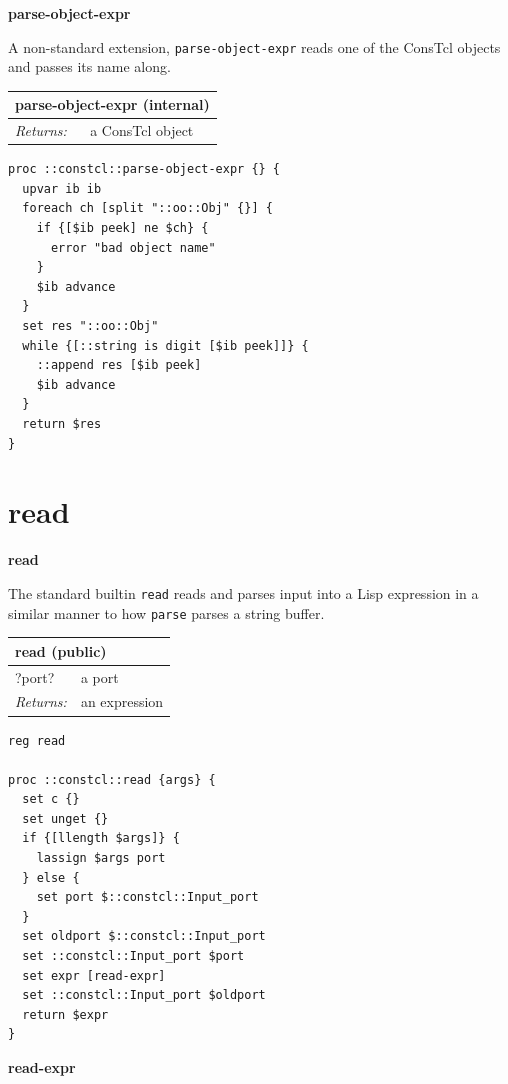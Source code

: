 \documentclass[twoside,9pt]{report}
\begin{document}
\textbf{parse-object-expr}


A non-standard extension, \texttt{parse-object-expr} reads one of the ConsTcl objects and passes its name along.

\begin{tabular}{ |l l| }
\hline
\multicolumn{2}{|l|}{parse-object-expr (internal)} \\
\hline
\textit{Returns:} & a ConsTcl object \\
\hline
\end{tabular}

\noindent\makebox[\linewidth]{\rule{\linewidth}{0.4pt}}
\begin{lstlisting}
proc ::constcl::parse-object-expr {} {
  upvar ib ib
  foreach ch [split "::oo::Obj" {}] {
    if {[$ib peek] ne $ch} {
      error "bad object name"
    }
    $ib advance
  }
  set res "::oo::Obj"
  while {[::string is digit [$ib peek]]} {
    ::append res [$ib peek]
    $ib advance
  }
  return $res
}
\end{lstlisting}
\noindent\makebox[\linewidth]{\rule{\linewidth}{0.4pt}}
\section{read}
\label{read}

\textbf{read}


The standard builtin \texttt{read} reads and parses input into a Lisp expression in a similar manner to how \texttt{parse} parses a string buffer.

\begin{tabular}{ |l l| }
\hline
\multicolumn{2}{|l|}{read (public)} \\
\hline
?port? & a port \\
\textit{Returns:} & an expression \\
\hline
\end{tabular}

\noindent\makebox[\linewidth]{\rule{\linewidth}{0.4pt}}
\begin{lstlisting}
reg read
 
proc ::constcl::read {args} {
  set c {}
  set unget {}
  if {[llength $args]} {
    lassign $args port
  } else {
    set port $::constcl::Input_port
  }
  set oldport $::constcl::Input_port
  set ::constcl::Input_port $port
  set expr [read-expr]
  set ::constcl::Input_port $oldport
  return $expr
}
\end{lstlisting}
\noindent\makebox[\linewidth]{\rule{\linewidth}{0.4pt}}

\textbf{read-expr}
\end{document}
